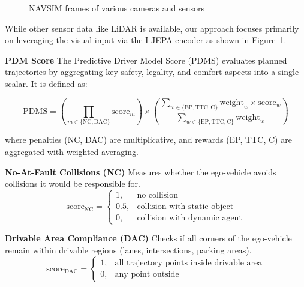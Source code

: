 \documentclass{article}
\begin{document}
\begin{figure}[ht]
    \centering
    \caption{NAVSIM frames of various cameras and sensors}
    \label{fig:navsim_scenario}
\end{figure}

While other sensor data like LiDAR is available, our approach focuses primarily on leveraging the visual input via the I-JEPA encoder as shown in Figure~\ref{fig:navsim_scenario}. 

\textbf{PDM Score}
The Predictive Driver Model Score (PDMS) evaluates planned trajectories by aggregating key safety, legality, and comfort aspects into a single scalar. It is defined as:

\begin{equation}
    \text{PDMS} = \left( \prod_{m \in \{\text{NC}, \text{DAC}\}} \text{score}_m \right) \times \left( \frac{\sum_{w \in \{\text{EP}, \text{TTC}, \text{C}\}} \text{weight}_w \times \text{score}_w}{\sum_{w \in \{\text{EP}, \text{TTC}, \text{C}\}} \text{weight}_w} \right)
    \label{eq:pdms}
\end{equation}

where penalties (NC, DAC) are multiplicative, and rewards (EP, TTC, C) are aggregated with weighted averaging.

\textbf{No-At-Fault Collisions (NC)}
Measures whether the ego-vehicle avoids collisions it would be responsible for.
\begin{equation}
    \text{score}_{\text{NC}} = 
    \begin{cases}
        1, & \text{no collision} \\
        0.5, & \text{collision with static object} \\
        0, & \text{collision with dynamic agent}
    \end{cases}
\end{equation}

\textbf{Drivable Area Compliance (DAC)}
Checks if all corners of the ego-vehicle remain within drivable regions (lanes, intersections, parking areas).
\begin{equation}
    \text{score}_{\text{DAC}} =
    \begin{cases}
        1, & \text{all trajectory points inside drivable area} \\
        0, & \text{any point outside}
    \end{cases}
\end{equation}
\end{document}
